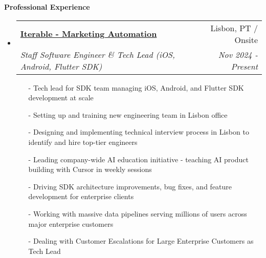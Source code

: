 \documentclass[letterpaper,11pt]{article}
\makeatletter
\newcommand{\resheading}[1]{{\large \colorbox{mygrey}{\begin{minipage}{\textwidth}{\textbf{#1 \vphantom{p\^{E}}}}\end{minipage}}}}
\newcommand{\ressubheading}[4]{
\begin{tabular*}{7.0in}{l@{\extracolsep{\fill}}r}
    \textbf{#1} & #2 \\
    \textit{#3} & \textit{#4} \\
\end{tabular*}\vspace{-6pt}}
\makeatother
\begin{document}
\vspace{0.2in}

\resheading{Professional Experience}
\begin{itemize}

\item
    \ressubheading{\href{https://iterable.com}{Iterable - Marketing Automation}}{Lisbon, PT / Onsite}{Staff Software Engineer \& Tech Lead (iOS, Android, Flutter SDK)}{Nov 2024 - Present}
    \begin{itemize}
        \item[-]{Tech lead for SDK team managing iOS, Android, and Flutter SDK development at scale}
        \item[-]{Setting up and training new engineering team in Lisbon office}
        \item[-]{Designing and implementing technical interview process in Lisbon to identify and hire top-tier engineers}
        \item[-]{Leading company-wide AI education initiative - teaching AI product building with Cursor in weekly sessions}
        \item[-]{Driving SDK architecture improvements, bug fixes, and feature development for enterprise clients}
        \item[-]{Working with massive data pipelines serving millions of users across major enterprise customers}
        \item[-]{Dealing with Customer Escalations for Large Enterprise Customers as Tech Lead}
    \end{itemize}


\end{itemize}
\end{document}
